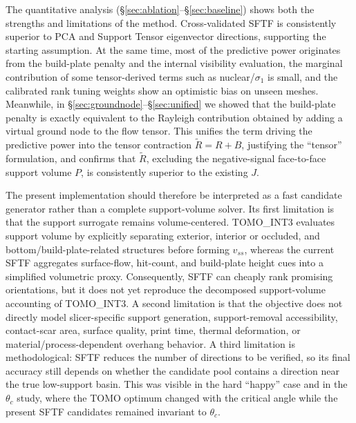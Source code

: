 \documentclass[11pt,a4paper]{article}
\begin{document}
The quantitative analysis (\S\ref{sec:ablation}--\S\ref{sec:baseline}) shows both the strengths and limitations of the method.
Cross-validated SFTF is consistently superior to PCA and Support Tensor eigenvector directions, supporting the starting assumption.
At the same time, most of the predictive power originates from the build-plate penalty and the internal visibility evaluation,
the marginal contribution of some tensor-derived terms such as nuclear/$\sigma_1$ is small, and
the calibrated rank tuning weights show an optimistic bias on unseen meshes.
Meanwhile, in \S\ref{sec:groundnode}--\S\ref{sec:unified} we showed that the build-plate penalty is exactly equivalent
to the Rayleigh contribution obtained by adding a virtual ground node to the flow tensor.
This unifies the term driving the predictive power into the tensor contraction $\tilde R=R+B$, justifying the ``tensor'' formulation,
and confirms that $\tilde R$, excluding the negative-signal face-to-face support volume $P$, is consistently superior to the existing $J$.

The present implementation should therefore be interpreted as a fast candidate generator rather than a complete support-volume solver.
Its first limitation is that the support surrogate remains volume-centered.
TOMO\_INT3 evaluates support volume by explicitly separating exterior, interior or occluded, and bottom/build-plate-related structures before forming $v_{ss}$,
whereas the current SFTF aggregates surface-flow, hit-count, and build-plate height cues into a simplified volumetric proxy.
Consequently, SFTF can cheaply rank promising orientations, but it does not yet reproduce the decomposed support-volume accounting of TOMO\_INT3.
A second limitation is that the objective does not directly model slicer-specific support generation, support-removal accessibility,
contact-scar area, surface quality, print time, thermal deformation, or material/process-dependent overhang behavior.
A third limitation is methodological: SFTF reduces the number of directions to be verified,
so its final accuracy still depends on whether the candidate pool contains a direction near the true low-support basin.
This was visible in the hard ``happy'' case and in the $\theta_c$ study, where the TOMO optimum changed with the critical angle while
the present SFTF candidates remained invariant to $\theta_c$.
\end{document}
